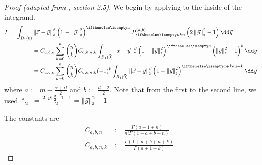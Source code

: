 \begin{proof}[Proof (adapted from \cite{2021-arbitrary-dimensions}, section 2.5)]
  We begin by applying  to the inside of the integrand.
  \begin{align*}
    I := \int_{B_1(\vec{0})} & \norm{\vec{x}-\vec{y}}^\beta \weight{y} \jacobi[n]{y} \dd\vec{y}                                                                                             \\
                             & = C_{a,b,n} \sum_{k=0}^n \binom{n}{k} C_{a,b,n,k} \int_{B_1(\vec{0})} \norm{\vec{x}-\vec{y}}^\beta \weight{y} \left(\norm{\vec{y}}^2 - 1\right)^k \dd\vec{y} \\
                             & = C_{a,b,n} \sum_{k=0}^n \binom{n}{k} C_{a,b,n,k} (-1)^k \int_{B_1(\vec{0})} \norm{\vec{x}-\vec{y}}^\beta \weight[a+k]{y} \dd\vec{y}
  \end{align*}
  where $a := m-\frac{\alpha+d}{2}$ and $b := \frac{d-2}{2}$.
  Note that from the first to the second line, we used $\frac{z-1}{2} = \frac{2\left\lVert\vec{y}\right\rVert_{\scriptscriptstyle 2}^2-1 - 1}{2} = \left\lVert\vec{y}\right\rVert_{\scriptscriptstyle 2}^2 - 1$.

  The constants are
  \begin{align*}
    C_{a,b,n}   & := \frac{\Gamma(a+1+n)}{n! \Gamma(1+a+b+n)}     \\
    C_{a,b,n,k} & := \frac{\Gamma(1+a+b+n + k)}{\Gamma(a+1+k)}\,.
  \end{align*}


\end{proof}
